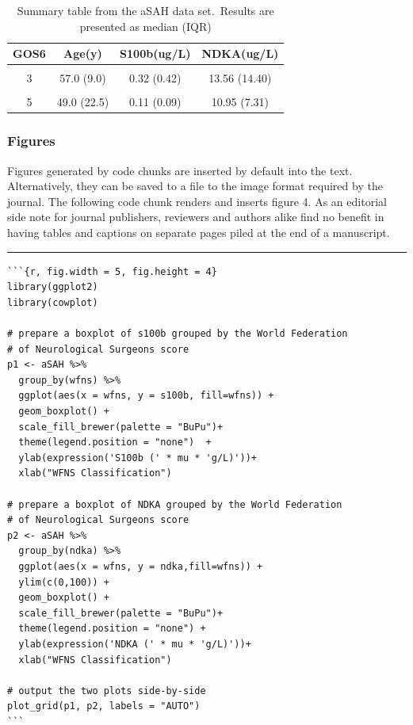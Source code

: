 \documentclass[]{elsarticle} %
\begin{document}
\begin{table}[H]

\caption{\label{tab:table1}Summary table from the aSAH data set.\
  Results are presented as median (IQR)}
\centering
\begin{tabular}[t]{cccc}
\toprule
GOS6 & Age(y) & S100b(ug/L) & NDKA(ug/L)\\
\midrule
\cellcolor[HTML]{E0FAFA}{1} & \cellcolor[HTML]{E0FAFA}{52.0 (21.2)} & \cellcolor[HTML]{E0FAFA}{0.29 (0.44)} & \cellcolor[HTML]{E0FAFA}{13.43 (9.81)}\\
3 & 57.0 (9.0) & 0.32 (0.42) & 13.56 (14.40)\\
\cellcolor[HTML]{E0FAFA}{4} & \cellcolor[HTML]{E0FAFA}{55.0 (16.0)} & \cellcolor[HTML]{E0FAFA}{0.12 (0.07)} & \cellcolor[HTML]{E0FAFA}{9.53 (6.80)}\\
5 & 49.0 (22.5) & 0.11 (0.09) & 10.95 (7.31)\\
\bottomrule
\end{tabular}
\end{table}

\hypertarget{figures}{%
\subsubsection{Figures}\label{figures}}

Figures generated by code chunks are inserted by default into the text.
Alternatively, they can be saved to a file to the image format required
by the journal. The following code chunk renders and inserts figure 4.
As an editorial side note for journal publishers, reviewers and authors
alike find no benefit in having tables and captions on separate pages
piled at the end of a manuscript.

\begin{center}\rule{0.5\linewidth}{0.5pt}\end{center}

\begin{verbatim}
```{r, fig.width = 5, fig.height = 4}
library(ggplot2)
library(cowplot)

# prepare a boxplot of s100b grouped by the World Federation 
# of Neurological Surgeons score
p1 <- aSAH %>%
  group_by(wfns) %>%
  ggplot(aes(x = wfns, y = s100b, fill=wfns)) +
  geom_boxplot() + 
  scale_fill_brewer(palette = "BuPu")+
  theme(legend.position = "none")  +
  ylab(expression('S100b (' * mu * 'g/L)'))+
  xlab("WFNS Classification")
  
# prepare a boxplot of NDKA grouped by the World Federation
# of Neurological Surgeons score  
p2 <- aSAH %>%
  group_by(ndka) %>%
  ggplot(aes(x = wfns, y = ndka,fill=wfns)) +
  ylim(c(0,100)) +
  geom_boxplot() +
  scale_fill_brewer(palette = "BuPu")+
  theme(legend.position = "none") +
  ylab(expression('NDKA (' * mu * 'g/L)'))+
  xlab("WFNS Classification")

# output the two plots side-by-side  
plot_grid(p1, p2, labels = "AUTO")
```
\end{verbatim}
\end{document}
